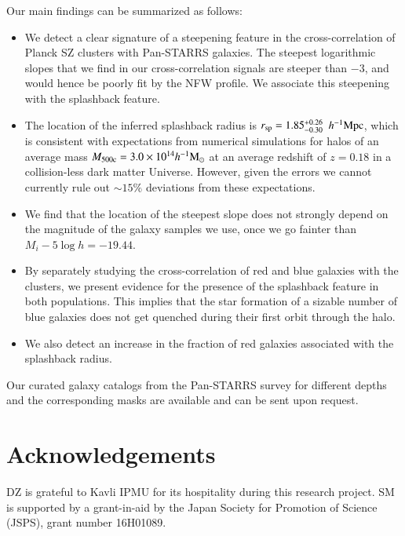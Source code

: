 \documentclass[iop, apjl, twocolappendix, numberedappendix]{emulateapj}
\def\mpch{h^{-1}{\rm Mpc}}
\def\msunh{h^{-1}{\rm M_{\odot}}}
\begin{document}
Our main findings can be summarized as follows:
\begin{itemize}
\item We detect a clear signature of a steepening feature in the
cross-correlation of Planck SZ clusters with Pan-STARRS
galaxies. The steepest logarithmic slopes that we find in our cross-correlation
signals are steeper than $-3$, and would hence be poorly fit by the
NFW profile. We associate this steepening with the splashback feature.
\item The location of the inferred splashback radius is $r_{\rm
sp}=1.85_{-0.30}^{+0.26}$ $\mpch$, which is consistent with expectations
from numerical simulations for
halos of an average mass $M_{\rm 500c}=3.0\times10^{14}\msunh$ at an
average redshift of $z=0.18$ in a collision-less dark matter Universe. 
However, given the errors we cannot
currently rule out $\sim15\%$ deviations from these expectations.
\item We find that the location of the steepest slope does not
strongly depend on the magnitude of the galaxy samples we use, once
we go fainter than $M_i-5\log h=-19.44$.
\item By separately studying the cross-correlation of red and blue
galaxies with the clusters, we present evidence for the presence of
the splashback feature in both populations. This implies that the
star formation of a sizable number of blue galaxies does not get
quenched during their first orbit through the halo.
\item We also detect an increase in the fraction of red
galaxies associated with the splashback radius. 
\end{itemize}

Our curated galaxy catalogs from the Pan-STARRS survey for different
depths and the corresponding masks are available and can be sent
upon request.

\section*{Acknowledgements}
DZ is grateful to Kavli IPMU for its hospitality during this
research project. SM is supported by a grant-in-aid by the Japan
Society for Promotion of Science (JSPS), grant number 16H01089.
\end{document}
